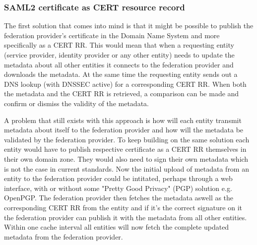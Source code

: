 \subsubsection{SAML2 certificate as CERT resource record}
\label{subsec:saml2-certificate-as-tlsa}
The first solution that comes into mind is that it might be possible to publish the federation provider's certificate in the Domain Name System and more specifically as a CERT RR\cite{rfc:4398}.
This would mean that when a requesting entity (service provider, identity provider or any other entity) needs to update the metadata about all other entities it connects to the federation provider and downloads the metadata.
At the same time the requesting entity sends out a DNS lookup (with DNSSEC active) for a corresponding CERT RR.
When both the metadata and the CERT RR is retrieved, a comparison can be made and confirm or dismiss the validity of the metadata.

A problem that still exists with this approach is how will each entity transmit metadata about itself to the federation provider and how will the metadata be validated by the federation provider.
To keep building on the same solution each entity would have to publish respective certificate as a CERT RR themselves in their own domain zone.
They would also need to sign their own metadata which is not the case in current standards. 
Now the initial upload of metadata from an entity to the federation provider could be intitated, perhaps through a web interface, with or without some "Pretty Good Privacy" (PGP) solution e.g. OpenPGP\cite{rfc:2440}.
The federation provider then fetches the metadata aswell as the corresponding CERT RR from the entity and if it's the correct signature on it the federation provider can publish it with the metadata from all other entities.
Within one cache interval all entities will now fetch the complete updated metadata from the federation provider.

